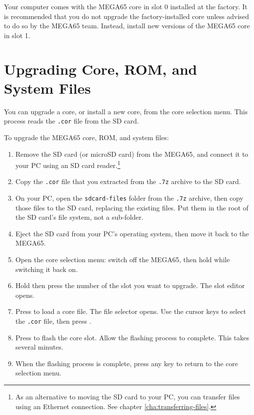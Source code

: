 Your computer comes with the MEGA65 core in slot 0 installed at the factory. It is recommended that you do not upgrade the factory-installed core unless advised to do so by the MEGA65 team. Instead, install new versions of the MEGA65 core in slot 1.

\section{Upgrading Core, ROM, and System Files}

You can upgrade a core, or install a new core, from the core selection menu. This process reads the {\tt .cor} file from the SD card.

To upgrade the MEGA65 core, ROM, and system files:

\begin{enumerate}
  \item Remove the SD card (or microSD card) from the MEGA65, and connect it to your PC using an SD card reader.\footnote{As an alternative to moving the SD card to your PC, you can transfer files using an Ethernet connection. See chapter \vref{cha:transferring-files}.}
  \item Copy the {\tt .cor} file that you extracted from the {\tt .7z} archive to the SD card.
  \item On your PC, open the {\tt sdcard-files} folder from the {\tt .7z} archive, then copy those files to the SD card, replacing the existing files. Put them in the root of the SD card's file system, not a sub-folder.
  \item Eject the SD card from your PC's operating system, then move it back to the MEGA65.
  \item Open the core selection menu: switch off the MEGA65, then hold  while switching it back on.
  \item Hold  then press the number of the slot you want to upgrade. The slot editor opens.
  \item Press  to load a core file. The file selector opens. Use the cursor keys to select the {\tt .cor} file, then press .
  \item Press  to flash the core slot. Allow the flashing process to complete. This takes several minutes.
  \item When the flashing process is complete, press any key to return to the core selection menu.
\end{enumerate}

